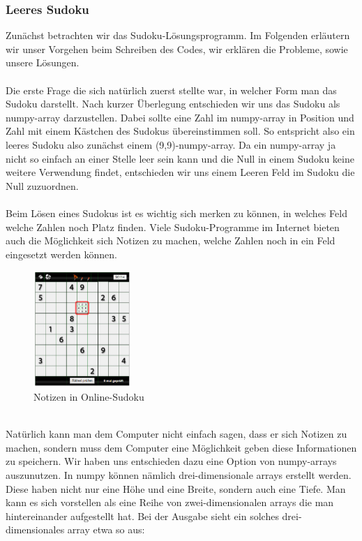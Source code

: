 \documentclass[11pt,a4paper]{article}
\begin{document}
\subsubsection{Leeres Sudoku}
Zunächst betrachten wir das Sudoku-Lösungsprogramm. Im Folgenden erläutern wir unser Vorgehen beim Schreiben des Codes, wir erklären die Probleme, sowie unsere Lösungen.\ \\
\ \\
Die erste Frage die sich natürlich zuerst stellte war, in welcher Form man das Sudoku darstellt. Nach kurzer Überlegung entschieden wir uns das Sudoku als numpy-array darzustellen. Dabei sollte eine Zahl im numpy-array in Position und Zahl mit einem Kästchen des Sudokus übereinstimmen soll. So entspricht also ein leeres Sudoku also zunächst einem (9,9)-numpy-array. Da ein numpy-array ja nicht so einfach an einer Stelle leer sein kann und die Null in einem Sudoku keine weitere Verwendung findet, entschieden wir uns einem Leeren Feld im Sudoku die Null zuzuordnen.\\
\ \\
Beim Lösen eines Sudokus ist es wichtig sich merken zu können, in welches Feld welche Zahlen noch Platz finden. Viele Sudoku-Programme im Internet bieten auch die Möglichkeit sich Notizen zu machen, welche Zahlen noch in ein Feld eingesetzt werden können.  
\ \\
\begin{figure}[htbp!]
\begin{center}
\includegraphics[width=0.33\textwidth]{sudoku1.pdf}
\end{center}
\caption{Notizen in Online-Sudoku}
\end{figure}
\ \\
Natürlich kann man dem Computer nicht einfach sagen, dass er sich Notizen zu machen, sondern muss dem Computer eine Möglichkeit geben diese Informationen zu speichern. Wir haben uns entschieden dazu eine Option von numpy-arrays auszunutzen. In numpy können nämlich drei-dimensionale arrays erstellt werden. Diese haben nicht nur eine Höhe und eine Breite, sondern auch eine Tiefe. Man kann es sich vorstellen als eine Reihe von zwei-dimensionalen arrays die man hintereinander aufgestellt hat. Bei der Ausgabe sieht ein solches drei-dimensionales array etwa so aus: 
\newpage
\end{document}
